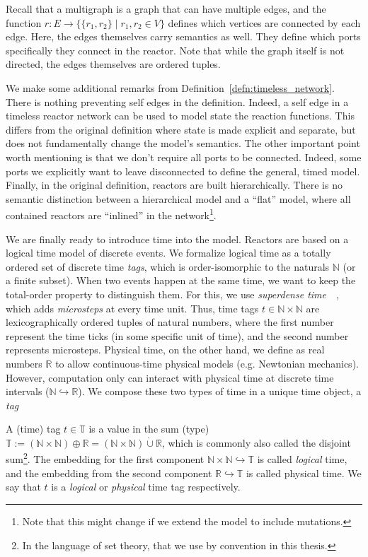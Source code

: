 Recall that a multigraph is a graph that can have multiple edges, and the function $r : E \rightarrow \{ \{r_1, r_2\} \mid r_1, r_2 \in V \}$ defines which vertices are connected by each edge.
Here, the edges themselves carry semantics as well. They define which ports specifically they connect in the reactor.
Note that while the graph itself is not directed, the edges themselves are ordered tuples.

We make some additional remarks from Definition~\ref{defn:timeless_network}. 
There is nothing preventing self edges in the definition.
Indeed, a self edge in a timeless reactor network can be used to model state the reaction functions.
This differs from the original definition where state is made explicit and separate, but does not fundamentally change the model's semantics.
The other important point worth mentioning is that we don't require all ports to be connected.
Indeed, some ports we explicitly want to leave disconnected to define the general, timed model. 
Finally, in the original definition, reactors are built hierarchically.
There is no semantic distinction between a hierarchical model and a ``flat'' model, where all contained reactors are ``inlined'' in the network\footnote{Note that this might change if we extend the model to include mutations.}.

We are finally ready to introduce time into the model.
Reactors are based on a logical time model of discrete events.
We formalize logical time as a totally ordered set of discrete time \emph{tags}, which is order-isomorphic to the naturals $\mathbb{N}$ (or a finite subset). 
When two events happen at the same time, we want to keep the total-order property to distinguish them.
For this, we use \emph{superdense time}~\cite{superdense,Ptolemaeus:14:SystemDesign}~, which adds \emph{microsteps} at every time unit.
Thus, time tags $t \in \mathbb{N} \times \mathbb{N}$ are lexicographically ordered tuples of natural numbers, where the first number represent the time ticks (in some specific unit of time), and the second number represents microsteps.
Physical time, on the other hand, we define as real numbers $\mathbb{R}$ to allow continuous-time physical models (e.g. Newtonian mechanics).
However, computation only can interact with physical time at discrete time intervals ($\mathbb{N} \hookrightarrow \mathbb{R}$).
We compose these two types of time in a unique time object, a \emph{tag}

\begin{defn}[tag]
    \label{defn:tags}
   A (time) tag $t \in \mathbb{T}$ is a value in the sum (type) $\mathbb{T} := (\mathbb{N} \times \mathbb{N}) \oplus \mathbb{R} = (\mathbb{N} \times \mathbb{N}) \dot{\cup} \mathbb{R}$, which is commonly also called the disjoint sum\footnote{In the language of set theory, that we use by convention in this thesis.}.
   The embedding for the first component $\mathbb{N} \times \mathbb{N} \hookrightarrow \mathbb{T}$ is called \emph{logical} time, and the embedding from the second component $\mathbb{R} \hookrightarrow \mathbb{T}$ is called physical time.
   We say that $t$ is a \emph{logical} or \emph{physical} time tag respectively.
\end{defn}

